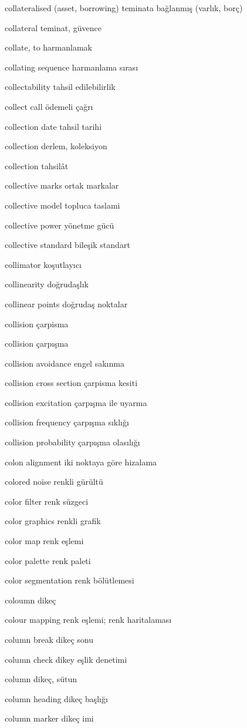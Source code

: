 \documentclass[12pt,fleqn]{article}\usepackage{../../common}
\begin{document}
collateralised (asset, borrowing) teminata bağlanmış (varlık, borç)

collateral teminat, güvence

collate, to harmanlamak

collating sequence harmanlama sırası

collectability tahsil edilebilirlik

collect call ödemeli çağrı

collection date tahsil tarihi

collection derlem, koleksiyon

collection tahsilât

collective marks ortak markalar

collective model topluca taslami

collective power yönetme gücü

collective standard bileşik standart

collimator koşutlayıcı

collinearity doğrudaşlık

collinear points doğrudaş noktalar

collision çarpisma

collision çarpışma

collision avoidance engel sakınma

collision cross section çarpisma kesiti

collision excitation çarpışma ile uyarma

collision frequency çarpışma sıklığı

collision probability çarpışma olasılığı

colon alignment iki noktaya göre hizalama

colored noise renkli gürültü

color filter renk süzgeci

color graphics renkli grafik

color map renk eşlemi

color palette renk paleti

color segmentation renk bölütlemesi

coloumn dikeç

colour mapping renk eşlemi; renk haritalaması

column break dikeç sonu

column check dikey eşlik denetimi

column dikeç, sütun

column heading dikeç başlığı

column marker dikeç imi
\end{document}
